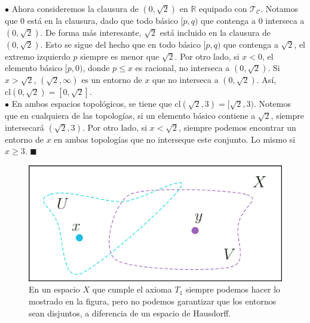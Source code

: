 \documentclass{article}
\begin{document}
$\bullet$ Ahora consideremos la clausura de $(0, \sqrt{2})$ en $\mathbb{R}$ equipado con $\mathcal{T_{C}}$. Notamos que $0$ está en la clausura, dado que todo básico $[p, q)$ que contenga a $0$ interseca a $(0, \sqrt{2})$. De forma más interesante, $\sqrt{2}$ está incluido en la clausura de $(0, \sqrt{2})$. Esto se sigue del hecho que en todo básico $[p, q)$ que contenga a $\sqrt{2}$, el extremo izquierdo $p$ siempre es menor que $\sqrt{2}$. Por otro lado, si $x < 0$, el elemento básico $[p, 0)$, donde $p \leq x$ es racional, no interseca a $(0, \sqrt{2})$. Si $x > \sqrt{2}$, $(\sqrt{2}, \infty)$ es un entorno de $x$ que no interseca a $(0, \sqrt{2})$. Así, $\text{cl}(0, \sqrt{2}) = [0, \sqrt{2}]$. \\

$\bullet$ En ambos espacios topológicos, se tiene que $\text{cl}(\sqrt{2}, 3) = [\sqrt{2}, 3)$. Notemos que en cualquiera de las topologías, si un elemento básico contiene a $\sqrt{2}$, siempre intersecará $(\sqrt{2}, 3)$. Por otro lado, si $x < \sqrt{2}$, siempre podemos encontrar un entorno de $x$ en ambas topologías que no interseque este conjunto. Lo mismo si $x \geq 3$.  \hspace*{\fill} $\blacksquare$
\vspace{0.5cm}

\begin{figure}[h]
	\centering \includegraphics[scale=0.15]{e2fig.png}
	\caption{En un espacio $X$ que cumple el axioma $T_{1}$ siempre podemos hacer lo mostrado en la figura, pero no podemos garantizar que los entornos sean disjuntos, a diferencia de un espacio de Hausdorff. }
\end{figure}
\end{document}

